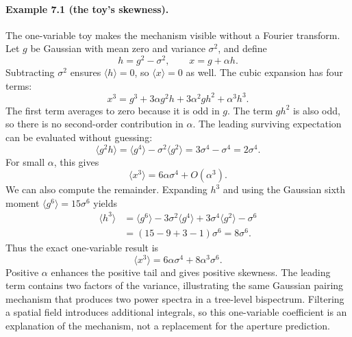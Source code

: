 \documentclass[11pt]{article}
\numberwithin{equation}{section}
\begin{document}
\paragraph{Example 7.1 (the toy's skewness).}
The one-variable toy makes the mechanism visible without a Fourier
transform. Let $g$ be Gaussian with mean zero and variance $\sigma^2$,
and define
\begin{equation}
 h=g^2-\sigma^2,\qquad x=g+\alpha h.
\end{equation}
Subtracting $\sigma^2$ ensures $\langle h\rangle=0$, so
$\langle x\rangle=0$ as well. The cubic expansion has four terms:
\begin{equation}
 x^3=g^3+3\alpha g^2h+3\alpha^2gh^2+\alpha^3h^3.
\end{equation}
The first term averages to zero because it is odd in $g$. The term
$gh^2$ is also odd, so there is no second-order contribution in $\alpha$.
The leading surviving expectation can be evaluated without guessing:
\begin{equation}
 \langle g^2h\rangle
 =\langle g^4\rangle-\sigma^2\langle g^2\rangle
 =3\sigma^4-\sigma^4=2\sigma^4.
\end{equation}
For small $\alpha$, this gives
\begin{equation}
 \langle x^3\rangle=6\alpha\sigma^4+O(\alpha^3).
 \label{eq:toyskewleading}
\end{equation}
We can also compute the remainder. Expanding $h^3$ and using the Gaussian
sixth moment $\langle g^6\rangle=15\sigma^6$ yields
\begin{equation}
\begin{split}
 \langle h^3\rangle
 &=\langle g^6\rangle-3\sigma^2\langle g^4\rangle
       +3\sigma^4\langle g^2\rangle-\sigma^6\\
 &=(15-9+3-1)\sigma^6=8\sigma^6.
\end{split}
\end{equation}
Thus the exact one-variable result is
\begin{equation}
 \langle x^3\rangle=6\alpha\sigma^4+8\alpha^3\sigma^6.
\end{equation}
Positive $\alpha$ enhances the positive tail and gives positive skewness.
The leading term contains two factors of the variance, illustrating the
same Gaussian pairing mechanism that produces two power spectra in a
tree-level bispectrum. Filtering a spatial field introduces additional
integrals, so this one-variable coefficient is an explanation of the
mechanism, not a replacement for the aperture prediction.
\end{document}
